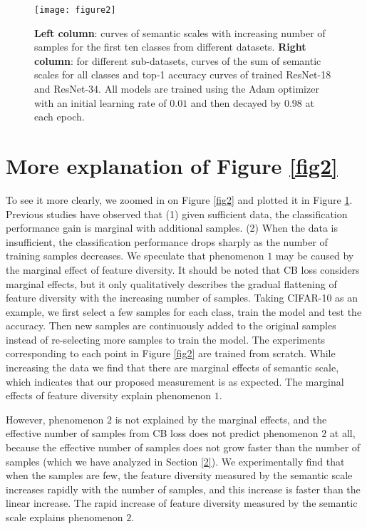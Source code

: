 \documentclass[10pt]{article} %
\begin{document}
\begin{figure}[t]%
\begin{center}
\texttt{[image: figure2]}
\vskip -0.14in
\caption{\textbf{Left column}: curves of semantic scales with increasing number of samples for the first ten classes from different datasets. \textbf{Right column}: for different sub-datasets, curves of the sum of semantic scales for all classes and top-1 accuracy curves of trained ResNet-18 and ResNet-34. All models are trained using the Adam optimizer \cite {paper33} with an initial learning rate of $0.01$ and then decayed by $0.98$ at each epoch.}
\label{fig26}
\end{center}
\vskip -0.1in
\end{figure}

\fi

\section{More explanation of Figure \ref{fig2}\label{K}}

To see it more clearly, we zoomed in on Figure \ref{fig2} and plotted it in Figure \ref{fig26}. Previous studies have observed that (1) given sufficient data, the classification performance gain is marginal with additional samples. (2) When the data is insufficient, the classification performance drops sharply as the number of training samples decreases. We speculate that phenomenon $1$ may be caused by the marginal effect of feature diversity. It should be noted that CB loss considers marginal effects, but it only qualitatively describes the gradual flattening of feature diversity with the increasing number of samples. Taking CIFAR-10 as an example, we first select a few samples for each class, train the model and test the accuracy. Then new samples are continuously added to the original samples instead of re-selecting more samples to train the model. The experiments corresponding to each point in Figure \ref{fig2} are trained from scratch. While increasing the data we find that there are marginal effects of semantic scale, which indicates that our proposed measurement is as expected. The marginal effects of feature diversity explain phenomenon $1$. 

However, phenomenon $2$ is not explained by the marginal effects, and the effective number of samples from CB loss does not predict phenomenon $2$ at all, because the effective number of samples does not grow faster than the number of samples (which we have analyzed in Section \ref{2}). We experimentally find that when the samples are few, the feature diversity measured by the semantic scale increases rapidly with the number of samples, and this increase is faster than the linear increase. The rapid increase of feature diversity measured by the semantic scale explains phenomenon $2$.
\end{document}

